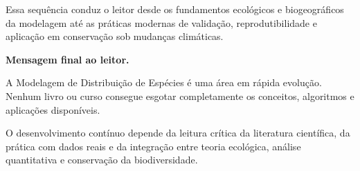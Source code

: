 \documentclass{ueap-sdm}
\begin{document}
Essa sequência conduz o leitor desde os fundamentos ecológicos e
biogeográficos da modelagem até as práticas modernas de validação,
reprodutibilidade e aplicação em conservação sob mudanças climáticas.

\begin{dica}
	\textbf{Mensagem final ao leitor.}
	
	A Modelagem de Distribuição de Espécies é uma área em rápida evolução.
	Nenhum livro ou curso consegue esgotar completamente os conceitos,
	algoritmos e aplicações disponíveis.
	
	O desenvolvimento contínuo depende da leitura crítica da literatura
	científica, da prática com dados reais e da integração entre teoria
	ecológica, análise quantitativa e conservação da biodiversidade.
\end{dica}

\backmatter
\printbibliography[title={Referências}]
\end{document}
